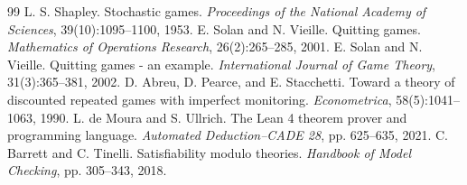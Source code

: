 \documentclass[11pt,a4paper]{article}
\theoremstyle{definition}
\begin{document}
\begin{thebibliography}{99}
 L. S. Shapley. Stochastic games. \textit{Proceedings of the National Academy of Sciences}, 39(10):1095--1100, 1953.
 E. Solan and N. Vieille. Quitting games. \textit{Mathematics of Operations Research}, 26(2):265--285, 2001.
 E. Solan and N. Vieille. Quitting games - an example. \textit{International Journal of Game Theory}, 31(3):365--381, 2002.
 D. Abreu, D. Pearce, and E. Stacchetti. Toward a theory of discounted repeated games with imperfect monitoring. \textit{Econometrica}, 58(5):1041--1063, 1990.
 L. de Moura and S. Ullrich. The Lean 4 theorem prover and programming language. \textit{Automated Deduction--CADE 28}, pp. 625--635, 2021.
 C. Barrett and C. Tinelli. Satisfiability modulo theories. \textit{Handbook of Model Checking}, pp. 305--343, 2018.
\end{thebibliography}
\end{document}
